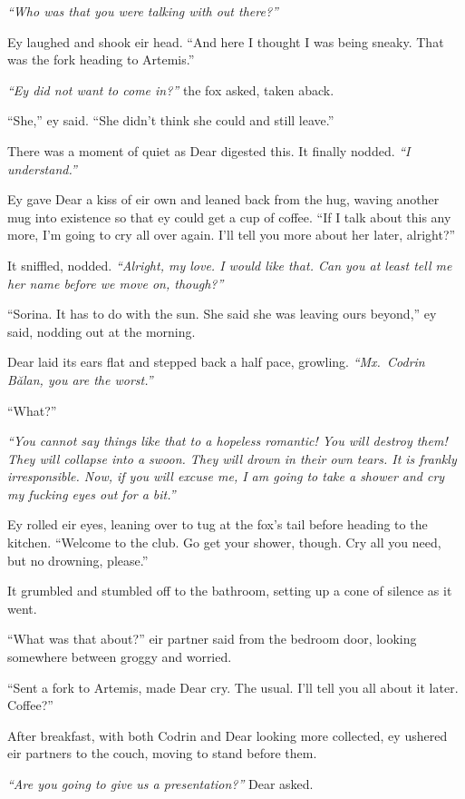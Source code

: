 \emph{``Who was that you were talking with out there?''}

Ey laughed and shook eir head. ``And here I thought I was being sneaky. That was the fork heading to Artemis.''

\emph{``Ey did not want to come in?''} the fox asked, taken aback.

``She,'' ey said. ``She didn't think she could and still leave.''

There was a moment of quiet as Dear digested this. It finally nodded. \emph{``I understand.''}

Ey gave Dear a kiss of eir own and leaned back from the hug, waving another mug into existence so that ey could get a cup of coffee. ``If I talk about this any more, I'm going to cry all over again. I'll tell you more about her later, alright?''

It sniffled, nodded. \emph{``Alright, my love. I would like that. Can you at least tell me her name before we move on, though?''}

``Sorina. It has to do with the sun. She said she was leaving ours beyond,'' ey said, nodding out at the morning.

Dear laid its ears flat and stepped back a half pace, growling. \emph{``Mx.~Codrin Bălan, you are the worst.''}

``What?''

\emph{``You cannot say things like that to a hopeless romantic! You will destroy them! They will collapse into a swoon. They will drown in their own tears. It is frankly irresponsible. Now, if you will excuse me, I am going to take a shower and cry my fucking eyes out for a bit.''}

Ey rolled eir eyes, leaning over to tug at the fox's tail before heading to the kitchen. ``Welcome to the club. Go get your shower, though. Cry all you need, but no drowning, please.''

It grumbled and stumbled off to the bathroom, setting up a cone of silence as it went.

``What was that about?'' eir partner said from the bedroom door, looking somewhere between groggy and worried.

``Sent a fork to Artemis, made Dear cry. The usual. I'll tell you all about it later. Coffee?''

After breakfast, with both Codrin and Dear looking more collected, ey ushered eir partners to the couch, moving to stand before them.

\emph{``Are you going to give us a presentation?''} Dear asked.

